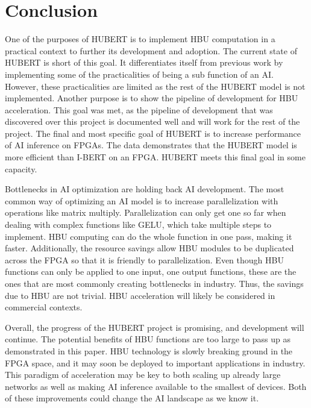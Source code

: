 \documentclass[12pt]{article}
\begin{document}
	\section{Conclusion}
	
	One of the purposes of HUBERT is to implement HBU computation in a practical context to further its development and adoption. The current state of HUBERT is short of this goal. It differentiates itself from previous work by implementing some of the practicalities of being a sub function of an AI. However, these practicalities are limited as the rest of the HUBERT model is not implemented. Another purpose is to show the pipeline of development for HBU acceleration. This goal was met, as the pipeline of development that was discovered over this project is documented well and will work for the rest of the project. The final and most specific goal of HUBERT is to increase performance of AI inference on FPGAs. The data demonstrates that the HUBERT model is more efficient than I-BERT on an FPGA. HUBERT meets this final goal in some capacity.
	
	Bottlenecks in AI optimization are holding back AI development. The most common way of optimizing an AI model is to increase parallelization with operations like matrix multiply. Parallelization can only get one so far when dealing with complex functions like GELU, which take multiple steps to implement. HBU computing can do the whole function in one pass, making it faster. Additionally, the resource savings allow HBU modules to be duplicated across the FPGA so that it is friendly to parallelization. Even though HBU functions can only be applied to one input, one output functions, these are the ones that are most commonly creating bottlenecks in industry. Thus, the savings due to HBU are not trivial. HBU acceleration will likely be considered in commercial contexts.
	
	Overall, the progress of the HUBERT project is promising, and development will continue. The potential benefits of HBU functions are too large to pass up as demonstrated in this paper. HBU technology is slowly breaking ground in the FPGA space, and it may soon be deployed to important applications in industry. This paradigm of acceleration may be key to both scaling up already large networks as well as making AI inference available to the smallest of devices. Both of these improvements could change the AI landscape as we know it.
	
	
	
	
\end{document}
